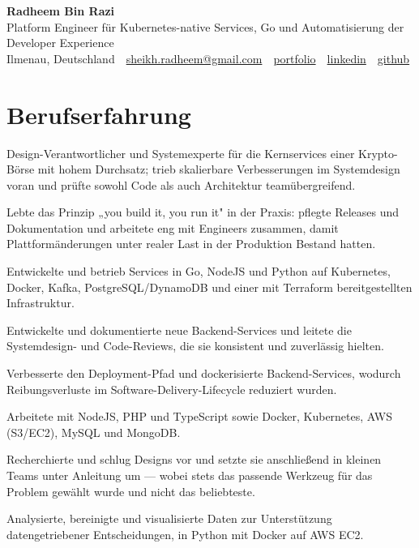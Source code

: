 \documentclass[11pt,a4paper]{resume}
\makeatletter
\newcommand{\Portfolio}{https://radheem.github.io/my-cv}
\newcommand{\PortfolioText}{portfolio}
\newcommand{\GitHub}{https://github.com/radheem}
\newcommand{\LinkedIn}{https://www.linkedin.com/in/radheem-razi}
\newcommand{\Email}{sheikh.radheem@gmail.com}
\makeatother
\begin{document}
\clearpage
{}

\begin{center}
  {\huge\bfseries Radheem Bin Razi}\\[3pt]
  {\large Platform Engineer für Kubernetes-native Services, Go und Automatisierung der Developer Experience}\\[6pt]
  \small
  Ilmenau, Deutschland \,\textbar\,
  \href{mailto:\Email}{\Email} \,\textbar\,
  \href{\Portfolio}{\PortfolioText} \,\textbar\,
  \href{\LinkedIn}{linkedin} \,\textbar\,
  \href{\GitHub}{github}
\end{center}
\vspace{2pt}

\section{Berufserfahrung}

\bullets
  \item Design-Verantwortlicher und Systemexperte für die Kernservices einer Krypto-Börse mit hohem Durchsatz; trieb skalierbare Verbesserungen im Systemdesign voran und prüfte sowohl Code als auch Architektur teamübergreifend.
  \item Lebte das Prinzip „you build it, you run it" in der Praxis: pflegte Releases und Dokumentation und arbeitete eng mit Engineers zusammen, damit Plattformänderungen unter realer Last in der Produktion Bestand hatten.
  \item Entwickelte und betrieb Services in Go, NodeJS und Python auf Kubernetes, Docker, Kafka, PostgreSQL/DynamoDB und einer mit Terraform bereitgestellten Infrastruktur.
\bulletsend
\vspace{3pt}
\bullets
  \item Entwickelte und dokumentierte neue Backend-Services und leitete die Systemdesign- und Code-Reviews, die sie konsistent und zuverlässig hielten.
  \item Verbesserte den Deployment-Pfad und dockerisierte Backend-Services, wodurch Reibungsverluste im Software-Delivery-Lifecycle reduziert wurden.
  \item Arbeitete mit NodeJS, PHP und TypeScript sowie Docker, Kubernetes, AWS (S3/EC2), MySQL und MongoDB.
\bulletsend
\vspace{3pt}
\bullets
  \item Recherchierte und schlug Designs vor und setzte sie anschließend in kleinen Teams unter Anleitung um — wobei stets das passende Werkzeug für das Problem gewählt wurde und nicht das beliebteste.
  \item Analysierte, bereinigte und visualisierte Daten zur Unterstützung datengetriebener Entscheidungen, in Python mit Docker auf AWS EC2.
\bulletsend
\vspace{3pt}
\end{document}
